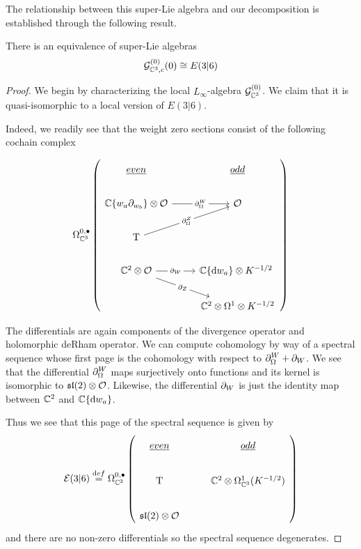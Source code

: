 The relationship between this super-Lie algebra and our decomposition is established through the following result.

\begin{prop}\label{prop:g0e36}
There is an equivalence of super-Lie algebras
\[
\mathcal{G}^{(0)}_{\mathbb{C}^3, c} (0) \cong E(3|6)
\]
\end{prop}
\begin{proof}
We begin by characterizing the local $L_\infty$-algebra $\mathcal{G}^{(0)}_{\mathbb{C}^3}$. We claim that it is quasi-isomorphic to a local version of $E(3|6)$. 

Indeed, we readily see that the weight zero sections consist of the following cochain complex

\begin{equation}
\Omega^{0,\bullet}_{\C^3} \left (
\begin{tikzcd}
\ul{even} & \ul{odd} \\
\C\{w_a\del_{w_b}\}\otimes \mc O\ar[r, "\del^W_\Omega" description]  & \mc O \\ 
\T \ar[ur, "\del^Z_\Omega" description] & \\
\C^2\otimes \mc O \ar[r, "\del_W" description]\ar[dr, "\del_Z" description] & \C\{\d w_a\} \otimes K^{-1/2}\ \\
& \C^2 \otimes \Omega^1\otimes K^{-1/2}
\end{tikzcd} \right)
\end{equation}

The differentials are again components of the divergence operator and holomorphic deRham operator. We can compute cohomology by way of a spectral sequence whose first page is the cohomology with respect to $\partial^W_\Omega + \partial_W$. We see that the differential $\partial^W_\Omega$ maps surjectively onto functions and its kernel is isomorphic to $\mathfrak{sl}(2) \otimes \mathcal{O}$. Likewise, the differential $\partial_W$ is just the identity map between $\mathbb{C}^2$ and $\mathbb{C}\{\mathrm{d} w_a\}$. 

Thus we see that this page of the spectral sequence is given by 
\begin{equation}
\mc E(3|6) \define \Omega^{0,\bullet}_{\C^3} \left (
\begin{tikzcd}
\ul{even} & \ul{odd} \\
\T & \C^2\otimes \Omega^1_{\C^3} (K^{-1/2}) \\
\mf {sl}(2)\otimes \mc O
\end{tikzcd} \right)
\end{equation}
and there are no non-zero differentials so the spectral sequence degenerates.


\end{proof}
